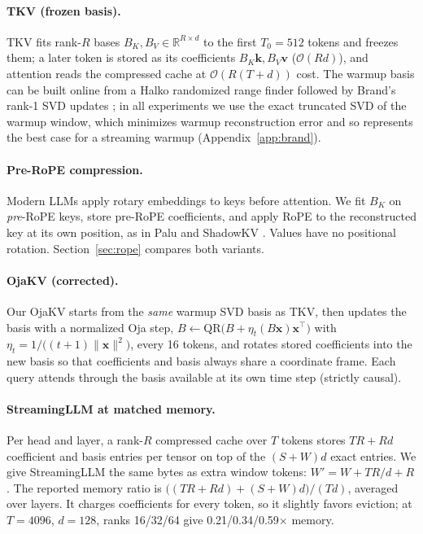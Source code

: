 \documentclass{article}
\newcommand{\R}{\mathbb{R}}
\begin{document}
\paragraph{TKV (frozen basis).}
TKV fits rank-$R$ bases $B_K, B_V \in \R^{R\times d}$ to the first
$T_0{=}512$ tokens and freezes them; a later token is stored as its
coefficients $B_K\mathbf{k}, B_V\mathbf{v}$ ($\mathcal{O}(Rd)$), and attention
reads the compressed cache at $\mathcal{O}(R(T{+}d))$ cost. The warmup basis
can be built online from a Halko randomized range finder \citep{halko2011}
followed by Brand's rank-1 SVD updates \citep{brand2006}; in all experiments we
use the exact truncated SVD of the warmup window, which minimizes warmup
reconstruction error and so represents the best case for a streaming warmup
(Appendix~\ref{app:brand}).

\paragraph{Pre-RoPE compression.}
Modern LLMs apply rotary embeddings \citep{rope2021} to keys before attention.
We fit $B_K$ on \emph{pre}-RoPE keys, store pre-RoPE coefficients, and apply
RoPE to the reconstructed key at its own position, as in Palu
\citep{palu2024} and ShadowKV \citep{shadowkv2024}. Values have no positional
rotation. Section~\ref{sec:rope} compares both variants.

\paragraph{OjaKV (corrected).}
Our OjaKV starts from the \emph{same} warmup SVD basis as TKV, then updates the
basis with a normalized Oja step,
$B \leftarrow \mathrm{QR}\bigl(B + \eta_t (B\mathbf{x})\mathbf{x}^\top\bigr)$ with
$\eta_t = 1/\bigl((t{+}1)\lVert\mathbf{x}\rVert^2\bigr)$, every 16 tokens, and
rotates stored coefficients into the new basis so that coefficients and basis
always share a coordinate frame. Each query attends through the basis
available at its own time step (strictly causal).

\paragraph{StreamingLLM at matched memory.}
Per head and layer, a rank-$R$ compressed cache over $T$ tokens stores
$TR + Rd$ coefficient and basis entries per tensor on top of the
$(S{+}W)d$ exact entries. We give StreamingLLM the same bytes as extra window
tokens: $W' = W + TR/d + R$. The reported memory ratio is
$\bigl((TR + Rd) + (S{+}W)d\bigr)/(Td)$, averaged over layers. It charges
coefficients for every token, so it slightly favors eviction; at $T{=}4096$,
$d{=}128$, ranks 16/32/64 give 0.21/0.34/0.59$\times$ memory.
\end{document}
